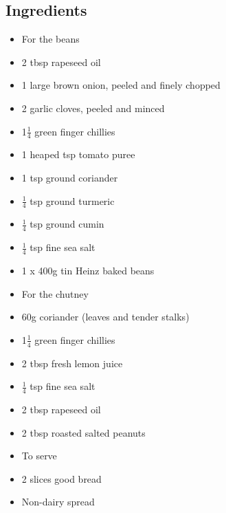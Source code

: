 \documentclass{book}
\begin{document}
\subsection*{Ingredients}
\begin{itemize}
\item For the beans 
\item 2 tbsp rapeseed oil 
\item 1 large brown onion, peeled and finely chopped
\item 2 garlic cloves, peeled and minced 
\item 1$\frac{1}{4}$ green finger chillies 
\item 1 heaped tsp tomato puree
\item 1 tsp ground coriander 
\item $\frac{1}{4}$ tsp ground turmeric 
\item $\frac{1}{4}$ tsp ground cumin 
\item $\frac{1}{4}$ tsp fine sea salt 
\item 1 x 400g tin Heinz baked beans
\end{itemize}

\begin{itemize}
\item For the chutney
\item 60g coriander (leaves and tender stalks) 
\item 1$\frac{1}{4}$ green finger chillies 
\item 2 tbsp fresh lemon juice 
\item $\frac{1}{4}$ tsp fine sea salt 
\item 2 tbsp rapeseed oil 
\item 2 tbsp roasted salted peanuts
\end{itemize}

\begin{itemize}
\item To serve
\item 2 slices good bread
\item Non-dairy spread
\end{itemize}
\end{document}
